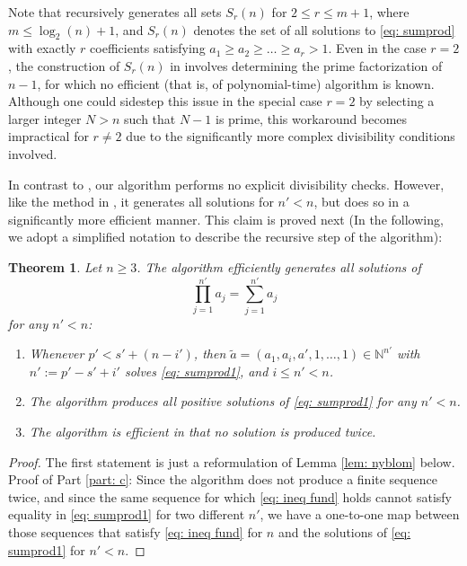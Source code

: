 \documentclass[10pt]{article}
\newtheorem{theorem}{Theorem}
\theoremstyle{definition}
\theoremstyle{remark}
\numberwithin{equation}{section}
\begin{document}
Note that \cite{nyblom2013} recursively generates all sets $S_r(n)$ for $2 \leq r \leq m+1$, where $m \leq \log_2(n) + 1$, and $S_r(n)$ denotes the set of all solutions to \eqref{eq: sumprod} with exactly $r$ coefficients satisfying $a_1 \geq a_2 \geq \dots \geq a_r > 1$.
Even in the case $r = 2$, the construction of $S_r(n)$ in \cite{nyblom2013} involves determining the prime factorization of $n - 1$, for which no efficient (that is, of polynomial-time) algorithm is known. Although one could sidestep this issue in the special case $r = 2$ by selecting a larger integer $N > n$ such that $N - 1$ is prime, this workaround becomes impractical for $r \neq 2$ due to the significantly more complex divisibility conditions involved.

In contrast to \cite{nyblom2013}, our algorithm performs no explicit divisibility checks. However, like the method in \cite{nyblom2013}, it generates all solutions for $n' < n$, but does so in a significantly more efficient manner. This claim is proved next (In the following, we adopt a simplified notation to describe the recursive step of the algorithm):
\begin{theorem}\label{th: eff working}
Let $n\geq 3$. The algorithm efficiently generates all solutions of
\begin{equation}\label{eq: sumprod1}
\prod_{j=1}^{n'} a_j = \sum_{j=1}^{n'} a_j
\end{equation}
for any $n'<n$:
\begin{enumerate}
\item Whenever $p'<s'+(n-i')$, then $\widetilde a=(a_1,a_i,a',1,\dots,1)\in\mathbb N^{n'}$ with $n':=p'-s'+i'$ solves 
\eqref{eq: sumprod1}, and $i\leq n'<n$.
\item \label{part: b} The algorithm produces all positive solutions of \eqref{eq: sumprod1} for any $n'< n$.
\item \label{part: c} The algorithm is efficient in that no solution is produced twice.
\end{enumerate}
\end{theorem}
\begin{proof}
The first statement is just a reformulation of Lemma \ref{lem: nyblom} below. Proof of Part \ref{part: c}: Since the algorithm does not produce a finite sequence twice, and since the same sequence for which \eqref{eq: ineq fund} holds cannot satisfy
equality in \eqref{eq: sumprod1} for two different $n'$, we have a one-to-one map between those sequences that satisfy \eqref{eq: ineq fund} for $n$ and the solutions of \eqref{eq: sumprod1} for $n'<n$.
\end{proof}
\end{document}
